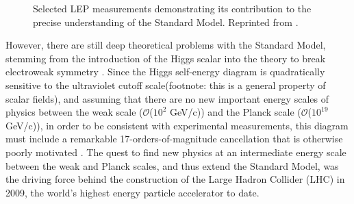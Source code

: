 \documentclass[dissertation.tex]{subfiles}
\begin{document}
\begin{figure}
	\caption{Selected LEP measurements demonstrating its contribution to the precise understanding of the Standard Model.  Reprinted from \cite{Drees}.}
	\label{fig:LEP}
\end{figure}

However, there are still deep theoretical problems with the Standard Model, stemming from the introduction of the Higgs scalar into the theory to break electroweak symmetry \cite{Higgs}.  Since the Higgs self-energy diagram is quadratically sensitive to the ultraviolet cutoff scale(footnote: this is a general property of scalar fields), and assuming that there are no new important energy scales of physics between the weak scale ($\mathcal{O}$($10^{2}$ GeV/c)) and the Planck scale ($\mathcal{O}$($10^{19}$ GeV/c)), in order to be consistent with experimental measurements, this diagram must include a remarkable 17-orders-of-magnitude cancellation that is otherwise poorly motivated \cite{Aitchison}.  The quest to find new physics at an intermediate energy scale between the weak and Planck scales, and thus extend the Standard Model, was the driving force behind the construction of the Large Hadron Collider (LHC) in 2009, the world's highest energy particle accelerator to date.
\end{document}
